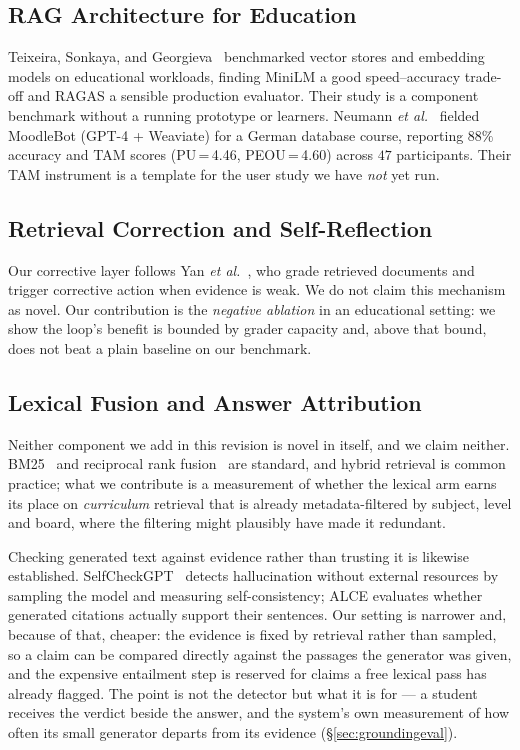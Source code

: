 \documentclass[conference]{IEEEtran}
\begin{document}
\subsection{RAG Architecture for Education}
Teixeira, Sonkaya, and Georgieva~\cite{teixeira2025} benchmarked vector stores
and embedding models on educational workloads, finding MiniLM a good
speed--accuracy trade-off and RAGAS a sensible production evaluator. Their study
is a component benchmark without a running prototype or learners.
Neumann \textit{et al.}~\cite{neumann2025} fielded MoodleBot (GPT-4 + Weaviate)
for a German database course, reporting $88\%$ accuracy and TAM scores
(PU\,=\,4.46, PEOU\,=\,4.60) across $47$ participants. Their TAM instrument is a
template for the user study we have \emph{not} yet run.

\subsection{Retrieval Correction and Self-Reflection}
Our corrective layer follows Yan \textit{et al.}~\cite{yan2024crag}, who grade
retrieved documents and trigger corrective action when evidence is weak. We do
not claim this mechanism as novel. Our contribution is the
\emph{negative ablation} in an educational setting: we show the loop's benefit
is bounded by grader capacity and, above that bound, does not beat a plain
baseline on our benchmark.

\subsection{Lexical Fusion and Answer Attribution}
Neither component we add in this revision is novel in itself, and we claim
neither. BM25~\cite{robertson2009} and reciprocal rank
fusion~\cite{cormack2009} are standard, and hybrid retrieval is common practice;
what we contribute is a measurement of whether the lexical arm earns its place
on \emph{curriculum} retrieval that is already metadata-filtered by subject,
level and board, where the filtering might plausibly have made it redundant.

Checking generated text against evidence rather than trusting it is likewise
established. SelfCheckGPT~\cite{manakul2023} detects hallucination without
external resources by sampling the model and measuring self-consistency; ALCE
\cite{gao2023} evaluates whether generated citations actually support their
sentences. Our setting is narrower and, because of that, cheaper: the evidence
is fixed by retrieval rather than sampled, so a claim can be compared directly
against the passages the generator was given, and the expensive entailment step
is reserved for claims a free lexical pass has already flagged. The point is not
the detector but what it is for --- a student receives the verdict beside the
answer, and the system's own measurement of how often its small generator
departs from its evidence (§\ref{sec:groundingeval}).
\end{document}
